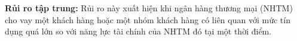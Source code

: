 \item \textbf{Rủi ro tập trung:} Rủi ro này xuất hiện khi ngân hàng thương mại (NHTM) cho vay một khách hàng hoặc một nhóm khách hàng có liên quan với mức tín dụng quá lớn so với năng lực tài chính của NHTM đó tại một thời điểm. 
